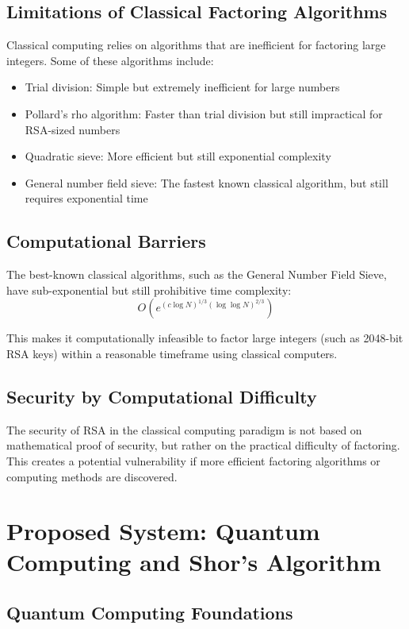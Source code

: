 \documentclass{article}
\begin{document}
\subsection{Limitations of Classical Factoring Algorithms}
Classical computing relies on algorithms that are inefficient for factoring large integers. Some of these algorithms include:
\begin{itemize}
    \item Trial division: Simple but extremely inefficient for large numbers
    \item Pollard's rho algorithm: Faster than trial division but still impractical for RSA-sized numbers
    \item Quadratic sieve: More efficient but still exponential complexity
    \item General number field sieve: The fastest known classical algorithm, but still requires exponential time
\end{itemize}

\subsection{Computational Barriers}
The best-known classical algorithms, such as the General Number Field Sieve, have sub-exponential but still prohibitive time complexity:
\[ O(e^{(c \log N)^{1/3} (\log \log N)^{2/3}}) \]

This makes it computationally infeasible to factor large integers (such as 2048-bit RSA keys) within a reasonable timeframe using classical computers.

\subsection{Security by Computational Difficulty}
The security of RSA in the classical computing paradigm is not based on mathematical proof of security, but rather on the practical difficulty of factoring. This creates a potential vulnerability if more efficient factoring algorithms or computing methods are discovered.

\section{Proposed System: Quantum Computing and Shor's Algorithm}
\subsection{Quantum Computing Foundations}
\end{document}
